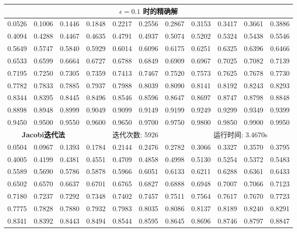 \documentclass{article}
\begin{document}
\begin{table}[H]
	\centering
	\begin{tabular}{|*{11}{c}|}
		\hline
		\multicolumn{11}{|c|}{\textbf{$\epsilon = 0.1$ 时的精确解}}\\
		\hline
		0.0526 & 0.1006 & 0.1446 & 0.1848 & 0.2217 & 0.2556 & 0.2867 & 0.3153 & 0.3417 & 0.3661 & 0.3886 \\
		0.4094 & 0.4288 & 0.4467 & 0.4635 & 0.4791 & 0.4937 & 0.5074 & 0.5202 & 0.5324 & 0.5438 & 0.5546 \\
		0.5649 & 0.5747 & 0.5840 & 0.5929 & 0.6014 & 0.6096 & 0.6175 & 0.6251 & 0.6325 & 0.6396 & 0.6466 \\
		0.6533 & 0.6599 & 0.6664 & 0.6727 & 0.6788 & 0.6849 & 0.6909 & 0.6967 & 0.7025 & 0.7082 & 0.7139 \\
		0.7195 & 0.7250 & 0.7305 & 0.7359 & 0.7413 & 0.7467 & 0.7520 & 0.7573 & 0.7625 & 0.7678 & 0.7730 \\
		0.7782 & 0.7833 & 0.7885 & 0.7937 & 0.7988 & 0.8039 & 0.8090 & 0.8141 & 0.8192 & 0.8243 & 0.8293 \\
		0.8344 & 0.8395 & 0.8445 & 0.8496 & 0.8546 & 0.8596 & 0.8647 & 0.8697 & 0.8747 & 0.8798 & 0.8848 \\
		0.8898 & 0.8948 & 0.8999 & 0.9049 & 0.9099 & 0.9149 & 0.9199 & 0.9249 & 0.9299 & 0.9349 & 0.9399 \\
		0.9450 & 0.9500 & 0.9550 & 0.9600 & 0.9650 & 0.9700 & 0.9750 & 0.9800 & 0.9850 & 0.9900 & 0.9950 \\
		\hline
		\multicolumn{3}{|c}{\textbf{Jacobi迭代法}} & \multicolumn{4}{|c}{迭代次数: 5926}\ & \multicolumn{4}{|c|}{运行时间: 3.4670s}\\
		\hline
		0.0504 & 0.0967 & 0.1393 & 0.1784 & 0.2144 & 0.2476 & 0.2782 & 0.3066 & 0.3327 & 0.3570 & 0.3795 \\
		0.4005 & 0.4199 & 0.4381 & 0.4551 & 0.4709 & 0.4858 & 0.4998 & 0.5130 & 0.5254 & 0.5372 & 0.5483 \\
		0.5589 & 0.5690 & 0.5786 & 0.5878 & 0.5966 & 0.6051 & 0.6133 & 0.6211 & 0.6288 & 0.6361 & 0.6433 \\
		0.6502 & 0.6570 & 0.6637 & 0.6701 & 0.6765 & 0.6827 & 0.6888 & 0.6948 & 0.7007 & 0.7066 & 0.7123 \\
		0.7180 & 0.7237 & 0.7292 & 0.7348 & 0.7402 & 0.7457 & 0.7511 & 0.7564 & 0.7617 & 0.7670 & 0.7723 \\
		0.7775 & 0.7828 & 0.7880 & 0.7932 & 0.7983 & 0.8035 & 0.8086 & 0.8137 & 0.8189 & 0.8240 & 0.8291 \\
		0.8341 & 0.8392 & 0.8443 & 0.8494 & 0.8544 & 0.8595 & 0.8645 & 0.8696 & 0.8746 & 0.8797 & 0.8847 \\

\end{tabular}
\end{table}
\end{document}
